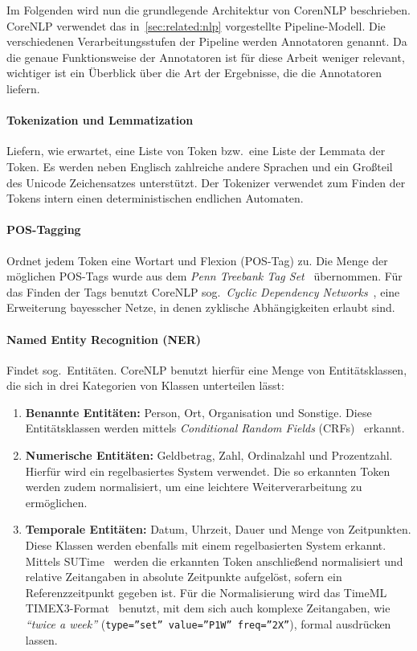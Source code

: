 Im Folgenden wird nun die grundlegende Architektur von CorenNLP beschrieben.
CoreNLP verwendet das in~\ref{sec:related:nlp} vorgestellte Pipeline-Modell.
Die verschiedenen Verarbeitungsstufen der Pipeline werden Annotatoren genannt.
Da die genaue Funktionsweise der Annotatoren ist für diese Arbeit weniger relevant, wichtiger ist ein Überblick über die Art der Ergebnisse, die die Annotatoren liefern.

\paragraph{Tokenization und Lemmatization}
Liefern, wie erwartet, eine Liste von Token bzw.\ eine Liste der Lemmata der Token.
Es werden neben Englisch zahlreiche andere Sprachen und ein Großteil des Unicode Zeichensatzes unterstützt.
Der Tokenizer verwendet zum Finden der Tokens intern einen deterministischen endlichen Automaten.

\paragraph{POS-Tagging}
Ordnet jedem Token eine Wortart und Flexion (POS-Tag) zu.
Die Menge der möglichen POS-Tags wurde aus dem \textit{Penn Treebank Tag Set}~\cite{PennTags} übernommen.
Für das Finden der Tags benutzt CoreNLP sog.\ \textit{Cyclic Dependency Networks}~\cite{Toutanova2003}, eine Erweiterung bayesscher Netze, in denen zyklische Abhängigkeiten erlaubt sind.

\paragraph{Named Entity Recognition (NER)}
Findet sog.\ Entitäten.
CoreNLP benutzt hierfür eine Menge von Entitätsklassen, die sich in drei Kategorien von Klassen unterteilen lässt:
\begin{enumerate}
	\item \textbf{Benannte Entitäten:}
		Person, Ort, Organisation und Sonstige.
		Diese Entitätsklassen werden mittels \textit{Conditional Random Fields} (CRFs)~\cite{Finkel2005} erkannt.
	\item \textbf{Numerische Entitäten:}
		Geldbetrag, Zahl, Ordinalzahl und Prozentzahl.
		Hierfür wird ein regelbasiertes System verwendet.
		Die so erkannten Token werden zudem normalisiert, um eine leichtere Weiterverarbeitung zu ermöglichen.
	\item \textbf{Temporale Entitäten:}
		Datum, Uhrzeit, Dauer und Menge von Zeitpunkten.
		Diese Klassen werden ebenfalls mit einem regelbasierten System erkannt.
		Mittels SUTime~\cite{Chang2012} werden die erkannten Token anschließend normalisiert und relative Zeitangaben in absolute Zeitpunkte aufgelöst, sofern ein Referenzzeitpunkt gegeben ist.
		Für die Normalisierung wird das TimeML TIMEX3-Format~\cite{TIMEX3} benutzt, mit dem sich auch komplexe Zeitangaben, wie \textit{``twice a week''} (\texttt{type=''set'' value=''P1W'' freq=''2X''}), formal ausdrücken lassen.
\end{enumerate}

